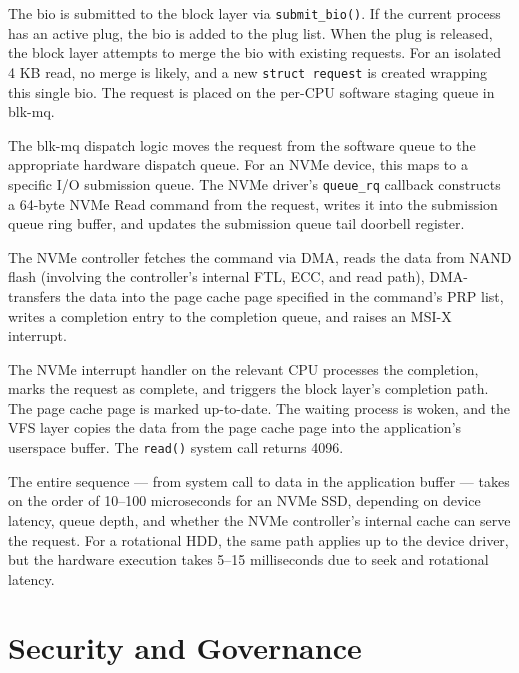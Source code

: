 The bio is submitted to the block layer via \texttt{submit\_bio()}. If the current process has an active plug, the bio is added to the plug list. When the plug is released, the block layer attempts to merge the bio with existing requests. For an isolated 4 KB read, no merge is likely, and a new \texttt{struct request} is created wrapping this single bio. The request is placed on the per-CPU software staging queue in blk-mq.

The blk-mq dispatch logic moves the request from the software queue to the appropriate hardware dispatch queue. For an NVMe device, this maps to a specific I/O submission queue. The NVMe driver's \texttt{queue\_rq} callback constructs a 64-byte NVMe Read command from the request, writes it into the submission queue ring buffer, and updates the submission queue tail doorbell register.

The NVMe controller fetches the command via DMA, reads the data from NAND flash (involving the controller's internal FTL, ECC, and read path), DMA-transfers the data into the page cache page specified in the command's PRP list, writes a completion entry to the completion queue, and raises an MSI-X interrupt.

The NVMe interrupt handler on the relevant CPU processes the completion, marks the request as complete, and triggers the block layer's completion path. The page cache page is marked up-to-date. The waiting process is woken, and the VFS layer copies the data from the page cache page into the application's userspace buffer. The \texttt{read()} system call returns 4096.

The entire sequence --- from system call to data in the application buffer --- takes on the order of 10--100 microseconds for an NVMe SSD, depending on device latency, queue depth, and whether the NVMe controller's internal cache can serve the request. For a rotational HDD, the same path applies up to the device driver, but the hardware execution takes 5--15 milliseconds due to seek and rotational latency.

\section{Security and Governance}
\label{sec:block-security}

